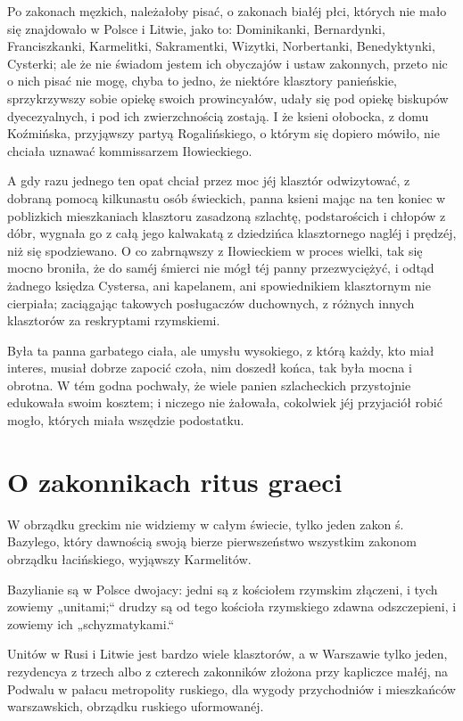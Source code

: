 \documentclass{book}
\begin{document}
Po zakonach męzkich, należałoby pisać, o zakonach białéj płci, których nie mało się znajdowało w Polsce i Litwie, jako to: Dominikanki, Bernardynki, Franciszkanki, Karmelitki, Sakramentki, Wizytki, Norbertanki, Benedyktynki, Cysterki; ale że nie świadom jestem ich obyczajów i ustaw zakonnych, przeto nic o nich pisać nie mogę, chyba to jedno, że niektóre klasztory panieńskie, sprzykrzywszy sobie opiekę swoich prowincyałów, udały się pod opiekę biskupów dyecezyalnych, i pod ich zwierzchnością zostają. I że ksieni ołobocka, z domu Koźmińska, przyjąwszy partyą Rogalińskiego, o którym się dopiero mówiło, nie chciała uznawać kommissarzem Iłowieckiego.

A gdy razu jednego ten opat chciał przez moc jéj klasztór odwizytować, z dobraną pomocą kilkunastu osób świeckich, panna ksieni mając na ten koniec w poblizkich mieszkaniach klasztoru zasadzoną szlachtę, podstarościch i chłopów z dóbr, wygnała go z całą jego kalwakatą z dziedzińca klasztornego nagléj i prędzéj, niż się spodziewano. O co zabrnąwszy z Iłowieckiem w proces wielki, tak się mocno broniła, że do saméj śmierci nie mógł téj panny przezwyciężyć, i odtąd żadnego księdza Cystersa, ani kapelanem, ani spowiednikiem klasztornym nie cierpiała; zaciągając takowych posługaczów duchownych, z różnych innych klasztorów za reskryptami rzymskiemi.

Była ta panna garbatego ciała, ale umysłu wysokiego, z którą każdy, kto miał interes, musiał dobrze zapocić czoła, nim doszedł końca, tak była mocna i obrotna. W tém godna pochwały, że wiele panien szlacheckich przystojnie edukowała swoim kosztem; i niczego nie żałowała, cokolwiek jéj przyjaciół robić mogło, których miała wszędzie podostatku.

\section{O zakonnikach ritus graeci}

W obrządku greckim nie widziemy w całym świecie, tylko jeden zakon ś. Bazylego, który dawnością swoją bierze pierwszeństwo wszystkim zakonom obrządku łacińskiego, wyjąwszy Karmelitów.

Bazylianie są w Polsce dwojacy: jedni są z kościołem rzymskim złączeni, i tych zowiemy „unitami;“ drudzy są od tego kościoła rzymskiego zdawna odszczepieni, i zowiemy ich „schyzmatykami.“

Unitów w Rusi i Litwie jest bardzo wiele klasztorów, a w Warszawie tylko jeden, rezydencya z trzech albo z czterech zakonników złożona przy kapliczce małéj, na Podwalu w pałacu metropolity ruskiego, dla wygody przychodniów i mieszkańców warszawskich, obrządku ruskiego uformowanéj.
\end{document}
